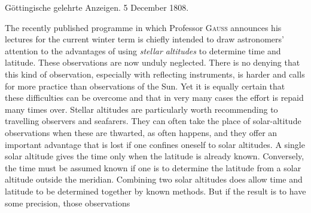 \clearpage
{}%
\begin{center}\small Göttingische gelehrte Anzeigen. 5 December 1808.\end{center}
\medskip
\enlargethispage{-9\baselineskip}
The recently published programme in which Professor \textsc{Gauss} announces his lectures for the current winter term is chiefly intended to draw astronomers’ attention to the advantages of using \textit{stellar altitudes} to determine time and latitude. These observations are now unduly neglected. There is no denying that this kind of observation, especially with reflecting instruments, is harder and calls for more practice than observations of the Sun. Yet it is equally certain that these difficulties can be overcome and that in very many cases the effort is repaid many times over. Stellar altitudes are particularly worth recommending to travelling observers and seafarers. They can often take the place of solar-altitude observations when these are thwarted, as often happens, and they offer an important advantage that is lost if one confines oneself to solar altitudes. A single solar altitude gives the time only when the latitude is already known. Conversely, the time must be assumed known if one is to determine the latitude from a solar altitude outside the meridian. Combining two solar altitudes does allow time and latitude to be determined together by known methods. But if the result is to have some precision, those observations
%
